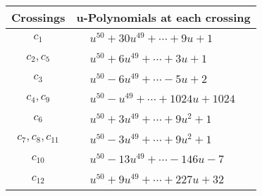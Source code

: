 \documentclass[1p]{elsarticle_modified}
\theoremstyle{definition}
\begin{document}
\begin{tabular}{m{50pt}|m{274pt}}
Crossings & \hspace{64pt}u-Polynomials at each crossing \\
\hline $$\begin{aligned}c_{1}\end{aligned}$$&$\begin{aligned}
&u^{50}+30 u^{49}+\cdots+9 u+1
\end{aligned}$\\
\hline $$\begin{aligned}c_{2},c_{5}\end{aligned}$$&$\begin{aligned}
&u^{50}+6 u^{49}+\cdots+3 u+1
\end{aligned}$\\
\hline $$\begin{aligned}c_{3}\end{aligned}$$&$\begin{aligned}
&u^{50}-6 u^{49}+\cdots-5 u+2
\end{aligned}$\\
\hline $$\begin{aligned}c_{4},c_{9}\end{aligned}$$&$\begin{aligned}
&u^{50}- u^{49}+\cdots+1024 u+1024
\end{aligned}$\\
\hline $$\begin{aligned}c_{6}\end{aligned}$$&$\begin{aligned}
&u^{50}+3 u^{49}+\cdots+9 u^2+1
\end{aligned}$\\
\hline $$\begin{aligned}c_{7},c_{8},c_{11}\end{aligned}$$&$\begin{aligned}
&u^{50}-3 u^{49}+\cdots+9 u^2+1
\end{aligned}$\\
\hline $$\begin{aligned}c_{10}\end{aligned}$$&$\begin{aligned}
&u^{50}-13 u^{49}+\cdots-146 u-7
\end{aligned}$\\
\hline $$\begin{aligned}c_{12}\end{aligned}$$&$\begin{aligned}
&u^{50}+9 u^{49}+\cdots+227 u+32
\end{aligned}$\\
\hline
\end{tabular}\\~\\
\end{document}
